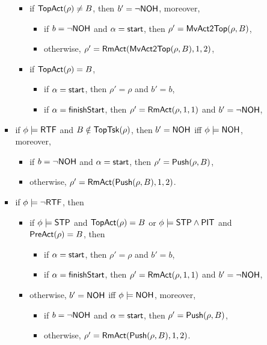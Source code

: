 \begin{itemize}
\begin{itemize}
\begin{itemize}
\begin{itemize}
				\item if $\mathsf{TopAct}(\rho) \neq B$, then $b' = \neg {\sf NOH}$, moreover, 
				\begin{itemize}
					\item if $b = \neg {\sf NOH}$ and $\alpha = {\mathsf{start} }$, then $\rho'= \mathsf{MvAct2Top}(\rho, B)$, 
					\item otherwise, $\rho' = \mathsf{RmAct}(\mathsf{MvAct2Top}(\rho, B), 1, 2)$, 
				\end{itemize}
				\item if $\mathsf{TopAct}(\rho) = B$, 
				\begin{itemize}
					\item if $\alpha = {\mathsf{start} }$, then $\rho' = \rho$ and $b' = b$,
					\item if $\alpha = {\mathsf{finishStart} }$, then $\rho' = \mathsf{RmAct}(\rho, 1, 1)$ and $b' = \neg{\sf NOH}$,
				\end{itemize}
			\end{itemize}
			\item if $\phi \models {\sf RTF}$ and $B \notin \mathsf{TopTsk}(\rho)$, then $b' = {\sf NOH}$ iff $\phi \models {\sf NOH}$, moreover,
			\begin{itemize}
				\item if $b = \neg {\sf NOH}$ and $\alpha = {\mathsf{start} }$, then $\rho' = \mathsf{Push}(\rho, B)$, 
				\item otherwise, $\rho' = \mathsf{RmAct}( \mathsf{Push}(\rho, B), 1, 2)$. 
			\end{itemize}
			\item if $\phi \models \neg {\sf RTF}$, then
			\begin{itemize}
				\item if $\phi \models {\sf STP}$ and $\mathsf{TopAct}(\rho) = B$ or $\phi \models {\sf STP}\wedge{\sf PIT}$ and $\mathsf{PreAct}(\rho) = B$, then 
				\begin{itemize}
					\item if $\alpha = {\mathsf{start} }$, then $\rho' = \rho$ and $b' = b$,
					\item if $\alpha = {\mathsf{finishStart} }$, then $\rho' = \mathsf{RmAct}(\rho, 1, 1)$ and $b' = \neg{\sf NOH}$,
				\end{itemize}
				\item otherwise, $b' = {\sf NOH}$ iff $\phi \models {\sf NOH}$, moreover,
				\begin{itemize}
					\item if $b = \neg {\sf NOH}$ and $\alpha = {\mathsf{start} }$, then $\rho' = \mathsf{Push}(\rho, B)$, 
					\item otherwise, $\rho' = \mathsf{RmAct}( \mathsf{Push}(\rho, B), 1, 2)$. 
				\end{itemize}
			\end{itemize}
		\end{itemize}
\end{itemize}


\end{itemize}
